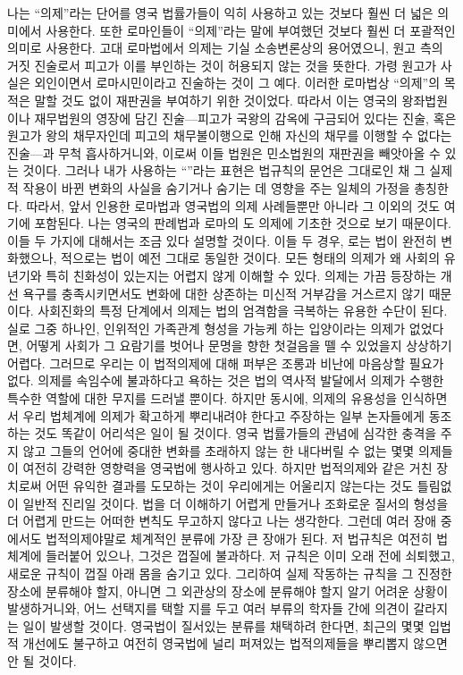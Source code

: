 나는 ``의제''라는 단어를 영국 법률가들이 익히 사용하고 있는 것보다
훨씬 더 넓은 의미에서 사용한다. 또한 로마인들이 ``의제''라는
말에 부여했던 것보다 훨씬 더 포괄적인 의미로 사용한다.
고대 로마법에서 의제는 기실 소송변론상의 용어였으니,
원고 측의 거짓 진술로서 피고가 이를 부인하는 것이 허용되지 않는 것을 뜻한다.
가령 원고가 사실은 외인이면서 로마시민이라고 진술하는 것이 그 예다.
이러한 로마법상 ``의제''의 목적은 말할 것도 없이 재판권을 부여하기 위한
것이었다.
\hypertarget{commonlawfiction}{따라서} 이는 영국의 왕좌법원이나
재무법원의 영장에 담긴
진술---피고가 국왕의 감옥에 구금되어 있다는 진술, 혹은
원고가 왕의 채무자인데 피고의 채무불이행으로 인해
자신의 채무를 이행할 수 없다는
진술---과 무척 흡사하거니와,
이로써 이들 법원은 민소법원의 재판권을 빼앗아올 수 있는
것이다.
그러나 내가 사용하는 ``''라는 표현은
법규칙의 문언은 그대로인 채 그 실제적 작용이 바뀐 변화의 사실을
숨기거나 숨기는 데 영향을 주는 일체의 가정을 총칭한다.
따라서, 앞서 인용한 로마법과 영국법의 의제 사례들뿐만 아니라
그 이외의 것도 여기에 포함된다. 나는 영국의 판례법과 로마의
도 의제에 기초한 것으로 보기 때문이다.
이들 두 가지에 대해서는 조금 있다 설명할 것이다.
이들 두 경우, 로는 법이 완전히 변화했으나,
적으로는 법이 예전 그대로 동일한 것이다.
모든 형태의 의제가 왜 사회의 유년기와 특히 친화성이 있는지는 어렵지 않게
이해할 수 있다.
의제는 가끔 등장하는 개선 욕구를 충족시키면서도
변화에 대한 상존하는 미신적 거부감을 거스르지 않기 때문이다.
사회진화의 특정 단계에서 의제는 법의 엄격함을 극복하는 유용한 수단이 된다.
실로 그중 하나인, 인위적인 가족관계 형성을 가능케 하는
입양이라는 의제가 없었다면, 어떻게 사회가 그 요람기를 벗어나
문명을 향한 첫걸음을 뗄 수 있었을지 상상하기 어렵다.
그러므로 우리는 이 법적의제에 대해 퍼부은 조롱과 비난에 마음상할
필요가 없다.
의제를 속임수에 불과하다고 욕하는 것은 법의 역사적 발달에서
의제가 수행한 특수한 역할에 대한 무지를 드러낼 뿐이다.
하지만 동시에, 의제의 유용성을 인식하면서 우리 법체계에 의제가
확고하게 뿌리내려야 한다고 주장하는 일부 논자들에게 동조하는 것도 똑같이
어리석은 일이 될 것이다.
영국 법률가들의 관념에 심각한 충격을 주지 않고
그들의 언어에 중대한 변화를 초래하지 않는 한
내다버릴 수 없는 몇몇 의제들이 여전히 강력한 영향력을 영국법에 행사하고 있다.
하지만 법적의제와 같은 거친 장치로써 어떤 유익한 결과를 도모하는 것이
우리에게는 어울리지 않는다는 것도 틀림없이 일반적 진리일 것이다.
법을 더 이해하기 어렵게 만들거나 조화로운 질서의 형성을 더 어렵게 만드는
어떠한 변칙도 무고하지 않다고 나는 생각한다.
그런데 여러 장애 중에서도 법적의제야말로 체계적인 분류에 가장 큰
장애가 된다.
저 법규칙은 여전히 법체계에 들러붙어 있으나,
그것은 껍질에 불과하다.
저 규칙은 이미 오래 전에 쇠퇴했고, 새로운 규칙이 껍질 아래 몸을 숨기고 있다.
그리하여 실제 작동하는 규칙을 그 진정한 장소에 분류해야 할지,
아니면 그 외관상의 장소에 분류해야 할지 알기 어려운 상황이 발생하거니와,
어느 선택지를 택할 지를 두고 여러 부류의 학자들 간에 의견이
갈라지는 일이 발생할 것이다.
영국법이 질서있는 분류를 채택하려 한다면,
최근의 몇몇 입법적 개선에도 불구하고 여전히 영국법에 널리 퍼져있는
법적의제들을 뿌리뽑지 않으면 안 될 것이다.

